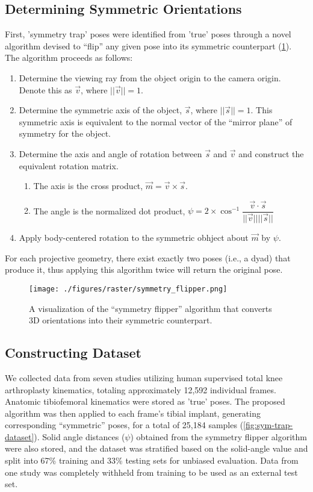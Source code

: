 \subsection{Determining Symmetric Orientations}
First, 'symmetry trap' poses were identified from 'true' poses through a novel algorithm devised to “flip” any given pose into its symmetric counterpart (\cref{fig:sym-flipper-alg}). The algorithm proceeds as follows:

\begin{enumerate}
  \item Determine the viewing ray from the object origin to the camera origin. Denote this as $\vec{v}$, where $||\vec{v}|| = 1$.
  \item Determine the symmetric axis of the object, $\vec{s}$, where $||\vec{s}|| = 1$. This symmetric axis is equivalent to the normal vector of the ``mirror plane'' of symmetry for the object.
  \item Determine the axis and angle of rotation between $\vec{s}$ and $\vec{v}$ and construct the equivalent rotation matrix.
        \begin{enumerate}
          \item The axis is the cross product, $\vec{m} = \vec{v} \times \vec{s}$.
          \item The angle is the normalized dot product, $\psi = 2 \times \cos^{-1}\dfrac{\vec{v} \cdot \vec{s}}{||\vec{v}||||\vec{s}||}$
        \end{enumerate}
  \item Apply body-centered rotation to the symmetric obhject about $\vec{m}$ by $\psi$.
\end{enumerate}

For each projective geometry, there exist exactly two poses (i.e., a dyad) that produce it, thus applying this algorithm twice will return the original pose.

\begin{figure}[h!]
  \centering
  \texttt{[image: ./figures/raster/symmetry\_flipper.png]}
  \caption{A visualization of the ``symmetry flipper'' algorithm that converts 3D orientations into their symmetric counterpart.}
  \label{fig:sym-flipper-alg}
\end{figure}

\subsection{Constructing Dataset}
We collected data from seven studies utilizing human supervised total knee arthroplasty kinematics, totaling approximately 12,592 individual frames.
Anatomic tibiofemoral kinematics were stored as 'true' poses.
The proposed algorithm was then applied to each frame's tibial implant, generating corresponding “symmetric” poses, for a total of 25,184 samples (\cref{fig:sym-trap-dataset}).
Solid angle distances ($\psi$) obtained from the symmetry flipper algorithm were also stored, and the dataset was stratified based on the solid-angle value and split into 67\% training and 33\% testing sets for unbiased evaluation.
Data from one study \cite{okamotoVivoKneeKinematics2011} was completely withheld from training to be used as an external test set.

